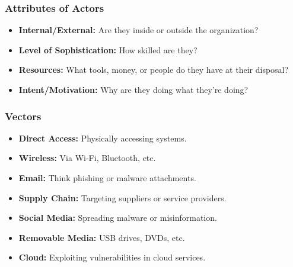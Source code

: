 \begin{fullwidth}
    \subsubsection*{\color{red}Attributes of Actors}
    \begin{itemize}
        \item \textbf{Internal/External:} Are they inside or outside the organization?
        \item \textbf{Level of Sophistication:} How skilled are they?
        \item \textbf{Resources:} What tools, money, or people do they have at their disposal?
        \item \textbf{Intent/Motivation:} Why are they doing what they’re doing?
    \end{itemize}

    \subsubsection*{\color{purple}Vectors}
    \begin{itemize}
        \item \textbf{Direct Access:} Physically accessing systems.
        \item \textbf{Wireless:} Via Wi-Fi, Bluetooth, etc.
        \item \textbf{Email:} Think phishing or malware attachments.
        \item \textbf{Supply Chain:} Targeting suppliers or service providers.
        \item \textbf{Social Media:} Spreading malware or misinformation.
        \item \textbf{Removable Media:} USB drives, DVDs, etc.
        \item \textbf{Cloud:} Exploiting vulnerabilities in cloud services.
    \end{itemize}


\end{fullwidth}
